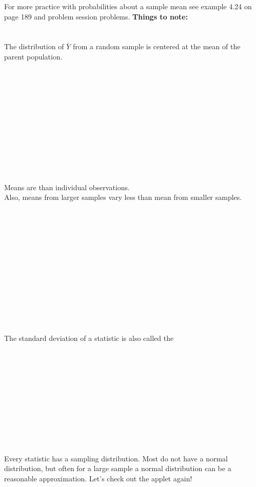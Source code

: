 For more practice with probabilities about a sample mean see example 4.24 on page 189 and problem session problems.
\newpage
\large\textbf{Things to note:} \normalsize\\~\\~\\
The distribution of $\bar{Y}$ from a random sample is centered at the mean of the parent population.\\~\\~\\~\\~\\~\\~\\~\\~\\~\\~\\~\\~\\
Means are \underbar{~~~~~~~~~~~~~~~~~~~~~~~~~~~~~~~~~~~~~~~~~~~~~~~~~} than individual observations.\\
Also, means from larger samples vary less than mean from smaller samples.\\~\\~\\~\\~\\~\\~\\~\\~\\~\\~\\~\\~\\~\\
The standard deviation of a statistic is also called the \underbar{~~~~~~~~~~~~~~~~~~~~~~~~~~~~~~~~~~~~~~~~~~~~~~~~~~~~~~~~~~~~}\\~\\~\\~\\~\\~\\~\\~\\~\\~\\~\\~\\
Every statistic has a sampling distribution.  Most do not have a normal distribution, but often for a large sample a normal distribution can be a reasonable approximation.  Let's check out the applet again!

